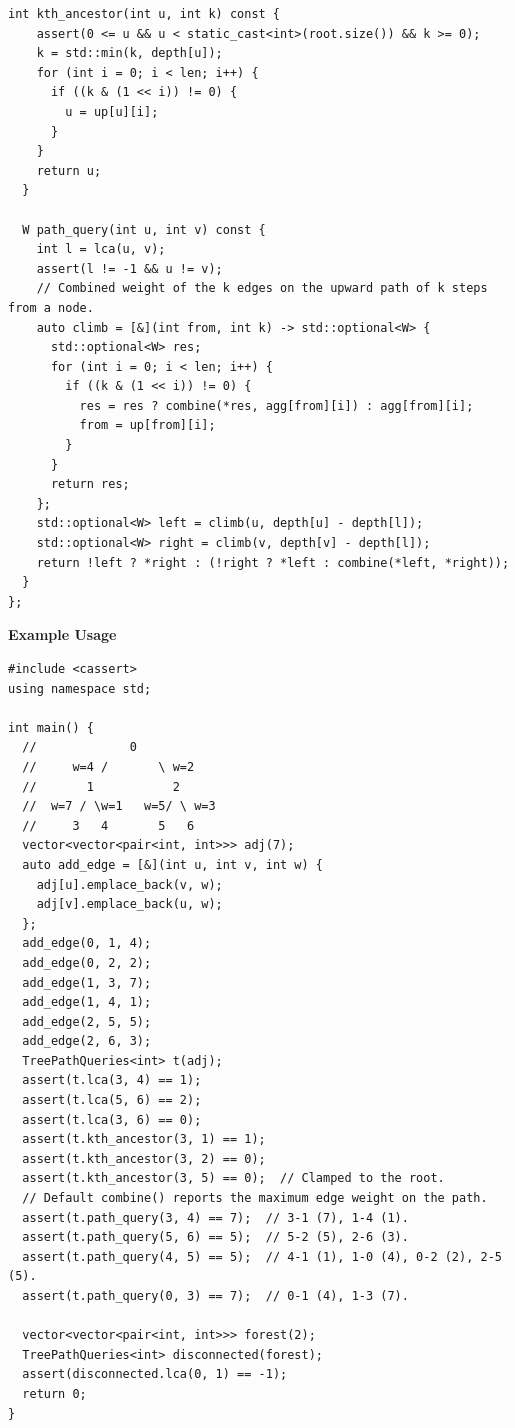 \begin{lstlisting}[style=cpp]
  int kth_ancestor(int u, int k) const {
    assert(0 <= u && u < static_cast<int>(root.size()) && k >= 0);
    k = std::min(k, depth[u]);
    for (int i = 0; i < len; i++) {
      if ((k & (1 << i)) != 0) {
        u = up[u][i];
      }
    }
    return u;
  }

  W path_query(int u, int v) const {
    int l = lca(u, v);
    assert(l != -1 && u != v);
    // Combined weight of the k edges on the upward path of k steps from a node.
    auto climb = [&](int from, int k) -> std::optional<W> {
      std::optional<W> res;
      for (int i = 0; i < len; i++) {
        if ((k & (1 << i)) != 0) {
          res = res ? combine(*res, agg[from][i]) : agg[from][i];
          from = up[from][i];
        }
      }
      return res;
    };
    std::optional<W> left = climb(u, depth[u] - depth[l]);
    std::optional<W> right = climb(v, depth[v] - depth[l]);
    return !left ? *right : (!right ? *left : combine(*left, *right));
  }
};
\end{lstlisting}
\textbf{Example Usage}\par
\begin{lstlisting}[style=cpp]
#include <cassert>
using namespace std;

int main() {
  //             0
  //     w=4 /       \ w=2
  //       1           2
  //  w=7 / \w=1   w=5/ \ w=3
  //     3   4       5   6
  vector<vector<pair<int, int>>> adj(7);
  auto add_edge = [&](int u, int v, int w) {
    adj[u].emplace_back(v, w);
    adj[v].emplace_back(u, w);
  };
  add_edge(0, 1, 4);
  add_edge(0, 2, 2);
  add_edge(1, 3, 7);
  add_edge(1, 4, 1);
  add_edge(2, 5, 5);
  add_edge(2, 6, 3);
  TreePathQueries<int> t(adj);
  assert(t.lca(3, 4) == 1);
  assert(t.lca(5, 6) == 2);
  assert(t.lca(3, 6) == 0);
  assert(t.kth_ancestor(3, 1) == 1);
  assert(t.kth_ancestor(3, 2) == 0);
  assert(t.kth_ancestor(3, 5) == 0);  // Clamped to the root.
  // Default combine() reports the maximum edge weight on the path.
  assert(t.path_query(3, 4) == 7);  // 3-1 (7), 1-4 (1).
  assert(t.path_query(5, 6) == 5);  // 5-2 (5), 2-6 (3).
  assert(t.path_query(4, 5) == 5);  // 4-1 (1), 1-0 (4), 0-2 (2), 2-5 (5).
  assert(t.path_query(0, 3) == 7);  // 0-1 (4), 1-3 (7).

  vector<vector<pair<int, int>>> forest(2);
  TreePathQueries<int> disconnected(forest);
  assert(disconnected.lca(0, 1) == -1);
  return 0;
}
\end{lstlisting}
